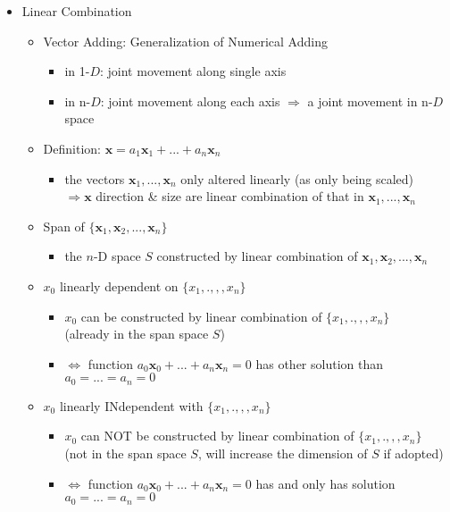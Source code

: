 \begin{itemize}
\item Linear Combination
	\begin{itemize}
	\item Vector Adding: Generalization of Numerical Adding
		\begin{itemize}
		\item in 1-$D$: joint movement along single axis
		\item in n-$D$: joint movement along each axis $\Rightarrow$ a joint movement in n-$D$ space
		\end{itemize}
	\item Definition: $\mathbf x = a_1\mathbf x_1 + ... + a_n\mathbf x_n$
		\begin{itemize}
		\item the vectors $\mathbf x_1,..., \mathbf x_n$ only altered linearly (as only being scaled) \\
			$\Rightarrow \mathbf x$ direction \& size are linear combination of that in $\mathbf x_1,..., \mathbf x_n$
		\end{itemize}
	\item Span of $\{\mathbf x_1, \mathbf x_2,...,\mathbf x_n\}$
		\begin{itemize}
		\item the $n$-D space $S$ constructed by linear combination of $\mathbf x_1, \mathbf x_2,...,\mathbf x_n$
		\end{itemize}
	\item $x_0$ linearly dependent on $\{x_1,.,,,x_n\}$ 
		\begin{itemize}
		\item $x_0$ can be constructed by linear combination of $\{x_1,.,,,x_n\}$ \\ 
		(already in the span space $S$)
		\item $\Leftrightarrow$ function $a_0\mathbf x_0 + ... + a_n\mathbf x_n=0$ has other solution than $a_0=...=a_n=0$
		\end{itemize}
	\item $x_0$ linearly INdependent with $\{x_1,.,,,x_n\}$	
		\begin{itemize}
		\item $x_0$ can NOT be constructed by linear combination of $\{x_1,.,,,x_n\}$ \\ 
		(not in the span space $S$, will increase the dimension of $S$ if adopted)
		\item $\Leftrightarrow$ function $a_0\mathbf x_0 + ... + a_n\mathbf x_n=0$ has and only has solution $a_0=...=a_n=0$
		\end{itemize}
	\end{itemize}


\end{itemize}
